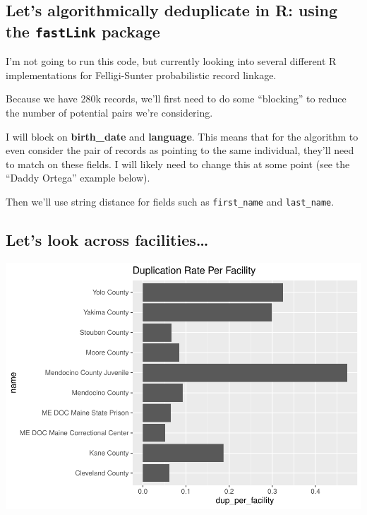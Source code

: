 \documentclass[
]{article}
\begin{document}
\hypertarget{lets-algorithmically-deduplicate-in-r-using-the-fastlink-package}{%
\subsection{\texorpdfstring{Let's algorithmically deduplicate in R:
using the \texttt{fastLink}
package}{Let's algorithmically deduplicate in R: using the fastLink package}}\label{lets-algorithmically-deduplicate-in-r-using-the-fastlink-package}}

I'm not going to run this code, but currently looking into several
different R implementations for Felligi-Sunter probabilistic record
linkage.

Because we have 280k records, we'll first need to do some ``blocking''
to reduce the number of potential pairs we're considering.

I will block on \textbf{birth\_date} and \textbf{language}. This means
that for the algorithm to even consider the pair of records as pointing
to the same individual, they'll need to match on these fields. I will
likely need to change this at some point (see the ``Daddy Ortega''
example below).

Then we'll use string distance for fields such as \texttt{first\_name}
and \texttt{last\_name}.

\hypertarget{lets-look-across-facilities}{%
\subsection{Let's look across
facilities\ldots{}}\label{lets-look-across-facilities}}

\includegraphics{report_8-5_files/figure-latex/unnamed-chunk-8-1.pdf}
\end{document}
